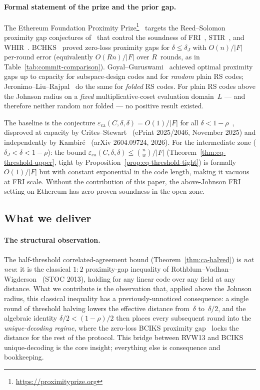 \documentclass[11pt]{article}
\begin{document}
\paragraph{Formal statement of the prize and the prior gap.}
The Ethereum Foundation Proximity Prize\footnote{\url{https://proximityprize.org}}~\cite{EFPrize} targets the Reed--Solomon proximity gap conjectures of~\cite{ABF} that control the soundness of FRI~\cite{BCIKS}, STIR~\cite{STIR}, and WHIR~\cite{WHIR}. BCHKS~\cite{BCHKS} proved zero-loss proximity gaps for $\delta \leq \delta_J$ with $O(n)/|F|$ per-round error (equivalently $O(Rn)/|F|$ over $R$~rounds, as in Table~\ref{tab:commit-comparison}). Goyal--Guruswami~\cite{GoyalGuruswami} achieved optimal proximity gaps up to capacity for subspace-design codes and for \emph{random} plain RS codes; Jeronimo--Liu--Rajpal~\cite{JLR} do the same for \emph{folded} RS codes. For plain RS codes above the Johnson radius on a \emph{fixed} multiplicative-coset evaluation domain~$L$ --- and therefore neither random nor folded --- no positive result existed.

The baseline is the conjecture $\varepsilon_{\mathrm{ca}}(C, \delta, \delta) = O(1)/|F|$ for all $\delta < 1{-}\rho$~\cite{ABF}, disproved at capacity by Crites--Stewart~\cite{CritesStewart} (ePrint 2025/2046, November 2025) and independently by Kambir\'e~\cite{Kambire} (arXiv 2604.09724, 2026). For the intermediate zone ($\delta_J < \delta < 1{-}\rho$): the bound $\varepsilon_{\mathrm{ca}}(C,\delta,\delta) \leq \binom{n}{w}/|F|$ (Theorem~\ref{thm:eq-threshold-upper}, tight by Proposition~\ref{prop:eq-threshold-tight}) is formally $O(1)/|F|$ but with constant exponential in the code length, making it vacuous at FRI scale. Without the contribution of this paper, the above-Johnson FRI setting on Ethereum has zero proven soundness in the open zone.

\subsection{What we deliver}

\paragraph{The structural observation.}
The half-threshold correlated-agreement bound (Theorem~\ref{thm:ca-halved}) is \emph{not new}: it is the classical $1{:}2$ proximity-gap inequality of Rothblum--Vadhan--Wigderson~\cite{RVW} (STOC 2013), holding for any linear code over any field at any distance.  What we contribute is the observation that, applied above the Johnson radius, this classical inequality has a previously-unnoticed consequence: a single round of threshold halving lowers the effective distance from~$\delta$ to~$\delta/2$, and the algebraic identity $\delta/2 < (1{-}\rho)/2$ then places every subsequent round into the \emph{unique-decoding regime}, where the zero-loss BCIKS proximity gap~\cite{BCIKS} locks the distance for the rest of the protocol.  This bridge between RVW13 and BCIKS unique-decoding is the core insight; everything else is consequence and bookkeeping.
\end{document}
